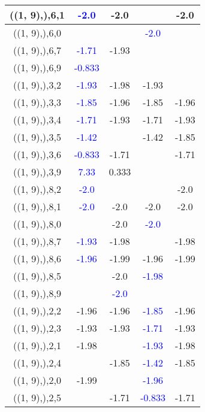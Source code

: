 \documentclass{article}
\begin{document}
\begin{center}
\begin{longtable}{|c|c|c|c|c|}
        	\hline
        	((1, 9),),6,1& \textcolor{blue}{-2.0}&-2.0&&-2.0\\
        	\hline
        	((1, 9),),6,0&&& \textcolor{blue}{-2.0}&\\
        	\hline
        	((1, 9),),6,7& \textcolor{blue}{-1.71}&-1.93&&\\
        	\hline
        	((1, 9),),6,9& \textcolor{blue}{-0.833}&&&\\
        	\hline
        	((1, 9),),3,2& \textcolor{blue}{-1.93}&-1.98&-1.93&\\
        	\hline
        	((1, 9),),3,3& \textcolor{blue}{-1.85}&-1.96&-1.85&-1.96\\
        	\hline
        	((1, 9),),3,4& \textcolor{blue}{-1.71}&-1.93&-1.71&-1.93\\
        	\hline
        	((1, 9),),3,5& \textcolor{blue}{-1.42}&&-1.42&-1.85\\
        	\hline
        	((1, 9),),3,6& \textcolor{blue}{-0.833}&-1.71&&-1.71\\
        	\hline
        	((1, 9),),3,9& \textcolor{blue}{7.33}&0.333&&\\
        	\hline
        	((1, 9),),8,2& \textcolor{blue}{-2.0}&&&-2.0\\
        	\hline
        	((1, 9),),8,1& \textcolor{blue}{-2.0}&-2.0&-2.0&-2.0\\
        	\hline
        	((1, 9),),8,0&&-2.0& \textcolor{blue}{-2.0}&\\
        	\hline
        	((1, 9),),8,7& \textcolor{blue}{-1.93}&-1.98&&-1.98\\
        	\hline
        	((1, 9),),8,6& \textcolor{blue}{-1.96}&-1.99&-1.96&-1.99\\
        	\hline
        	((1, 9),),8,5&&-2.0& \textcolor{blue}{-1.98}&\\
        	\hline
        	((1, 9),),8,9&& \textcolor{blue}{-2.0}&&\\
        	\hline
        	((1, 9),),2,2&-1.96&-1.96& \textcolor{blue}{-1.85}&-1.96\\
        	\hline
        	((1, 9),),2,3&-1.93&-1.93& \textcolor{blue}{-1.71}&-1.93\\
        	\hline
        	((1, 9),),2,1&-1.98&& \textcolor{blue}{-1.93}&-1.98\\
        	\hline
        	((1, 9),),2,4&&-1.85& \textcolor{blue}{-1.42}&-1.85\\
        	\hline
        	((1, 9),),2,0&-1.99&& \textcolor{blue}{-1.96}&\\
        	\hline
        	((1, 9),),2,5&&-1.71& \textcolor{blue}{-0.833}&-1.71\\

\end{longtable}
\end{center}
\end{document}
